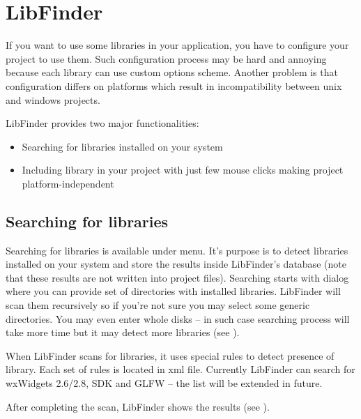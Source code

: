 \section{LibFinder}\label{sec:lib_finder}

If you want to use some libraries in your application, you have to configure your project to use them. Such configuration process may be hard and annoying because each library can use custom options scheme. Another problem is that configuration differs on platforms which result in incompatibility between unix and windows projects.

LibFinder provides two major functionalities:

\begin{itemize}
\item Searching for libraries installed on your system
\item Including library in your project with just few mouse clicks making project platform-independent
\end{itemize}

\subsection{Searching for libraries}

Searching for libraries is available under  menu. It's purpose is to detect libraries installed on your system and store the results inside LibFinder's database (note that these results are not written into \codeblocks project files). Searching starts with dialog where you can provide set of directories with installed libraries. LibFinder will scan them recursively so if you're not sure you may select some generic directories. You may even enter whole disks -- in such case searching process will take more time but it may detect more libraries (see ).


When LibFinder scans for libraries, it uses special rules to detect presence of library. Each set of rules is located in xml file. Currently LibFinder can search for wxWidgets 2.6/2.8, \codeblocks SDK and GLFW -- the list will be extended in future.


After completing the scan, LibFinder shows the results (see ).

